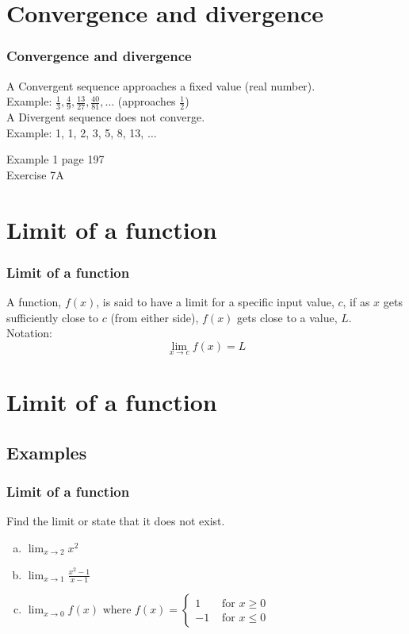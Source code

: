 \documentclass{beamer}
\begin{document}
\section{Convergence and divergence}
\frame
{
  \frametitle{Convergence and divergence}
\begin{definition}
A \alert{Convergent} sequence approaches a fixed value (real number).\\
Example: $\frac {1}{3}, \frac {4}{9}, \frac {13}{27},  \frac {40}{81}, \dots$ (approaches $\frac {1}{2}$)\\[5pt]
A \alert{Divergent} sequence does not converge.\\
Example: 1, 1, 2, 3, 5, 8, 13, $\dots$
\end{definition}
\begin{flushright}
    Example 1 page 197\\
    Exercise 7A
\end{flushright}
}

\section{Limit of a function}
\frame
{
  \frametitle{Limit of a function}
  \begin{definition}
  A function, $f(x)$, is said to have a \alert{limit} for a specific input value, $c$, if as $x$ gets sufficiently close to $c$ (from either side), $f(x)$ gets close to a value, $L$.\\
Notation: \[\lim_{x \rightarrow c} {f(x)} = L\]
  \end{definition}
}

\section{Limit of a function}
\subsection{Examples}
\frame
{
  \frametitle{Limit of a function}
\begin{example}
Find the limit or state that it does not exist.
\begin{enumerate}[(a)]
\item $\displaystyle{\lim_{x \rightarrow 2}{x^2}}$\\
\item $\displaystyle{\lim_{x \rightarrow 1}{\frac{x^2-1}{x-1}}}$
\item $\displaystyle{\lim_{x \rightarrow 0}{f(x)}} \text{ where } f(x)= \left \{
\begin{array}{rl}
1 & \text{ for } x\geq 0 \\ 
-1 & \text{ for } x\leq 0 
\end{array}
\right.$
\end{enumerate}
\end{example}
}
\end{document}
